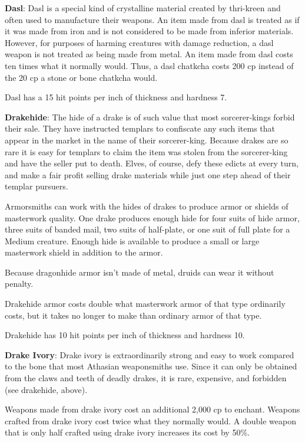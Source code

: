 \textbf{Dasl}: Dasl is a special kind of crystalline material created by thri-kreen and often used to manufacture their weapons. An item made from dasl is treated as if it was made from iron and is not considered to be made from inferior materials. However, for purposes of harming creatures with damage reduction, a dasl weapon is not treated as being made from metal. An item made from dasl costs ten times what it normally would. Thus, a dasl chatkcha costs 200 cp instead of the 20 cp a stone or bone chatkcha would.

Dasl has a 15 hit points per inch of thickness and hardness 7.

\textbf{Drakehide}: The hide of a drake is of such value that most sorcerer-kings forbid their sale. They have instructed templars to confiscate any such items that appear in the market in the name of their sorcerer-king. Because drakes are so rare it is easy for templars to claim the item was stolen from the sorcerer-king and have the seller put to death. Elves, of course, defy these edicts at every turn, and make a fair profit selling drake materials while just one step ahead of their templar pursuers.

Armorsmiths can work with the hides of drakes to produce armor or shields of masterwork quality. One drake produces enough hide for four suits of hide armor, three suits of banded mail, two suits of half-plate, or one suit of full plate for a Medium creature. Enough hide is available to produce a small or large masterwork shield in addition to the armor.

Because dragonhide armor isn't made of metal, druids can wear it without penalty.

Drakehide armor costs double what masterwork armor of that type ordinarily costs, but it takes no longer to make than ordinary armor of that type.

Drakehide has 10 hit points per inch of thickness and hardness 10.

\textbf{Drake Ivory}: Drake ivory is extraordinarily strong and easy to work compared to the bone that most Athasian weaponsmiths use. Since it can only be obtained from the claws and teeth of deadly drakes, it is rare, expensive, and forbidden (see drakehide, above).

Weapons made from drake ivory cost an additional 2,000 cp to enchant. Weapons crafted from drake ivory cost twice what they normally would. A double weapon that is only half crafted using drake ivory increases its cost by 50\%.

